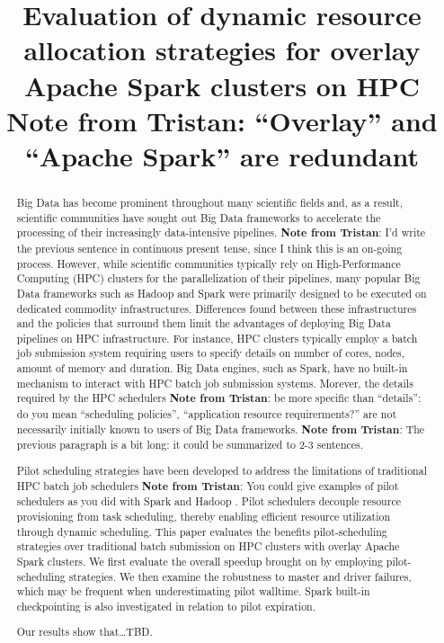 \documentclass{IEEEtran}
\newcommand{\tristan}[1]{\color{red}\textbf{Note from Tristan}:
      #1 \color{black}}
\newcommand{\TG}[1]{\tristan{#1}}
\begin{document}
\title{Evaluation of dynamic resource allocation strategies for overlay Apache
       Spark clusters on HPC \tristan{``Overlay'' and ``Apache Spark'' are redundant}}
\author{
    \IEEEauthorblockA{}
}
\maketitle

\begin{abstract}
    Big Data has become prominent throughout many scientific fields and, as a
    result, scientific communities have sought out Big Data frameworks to 
    accelerate the processing of their increasingly data-intensive pipelines.
    \TG{I'd write the previous sentence in continuous present tense, since I think
    this is an on-going process.}
    However, while scientific communities typically rely on High-Performance 
    Computing (HPC) clusters for the parallelization of their pipelines, many 
    popular Big Data frameworks such as Hadoop and Spark were primarily designed
    to be executed on dedicated commodity infrastructures. Differences found between
    these infrastructures and the policies that surround them limit the advantages
    of deploying Big Data pipelines on HPC infrastructure. For instance, HPC
    clusters typically employ a batch job submission system requiring users to
    specify details on number of cores, nodes, amount of memory and duration.
    Big Data engines, such as Spark, have no built-in mechanism to interact with
    HPC batch job submission systems. Morever, the details required by the HPC
    schedulers \TG{be more specific than ``details'': do you mean ``scheduling policies'',
    ``application resource requirerments?''
    } are not necessarily initially known to users of Big Data frameworks.
    \TG{The previous paragraph is a bit long: it could be summarized to 2-3
    sentences.}

    Pilot scheduling strategies have been developed to address the limitations 
    of traditional HPC batch job schedulers \TG{You could give examples of pilot schedulers as you did with Spark and Hadoop}.
    Pilot schedulers decouple resource
    provisioning from task scheduling, thereby enabling efficient resource
    utilization through dynamic scheduling. This paper evaluates the benefits 
    pilot-scheduling strategies over traditional batch submission
    on HPC clusters with overlay Apache Spark clusters. We first evaluate the
    overall speedup brought on by employing pilot-scheduling strategies. We then
    examine the robustness to master and driver failures, which may be frequent 
    when underestimating pilot walltime. Spark built-in checkpointing is also 
    investigated in relation to pilot expiration.

    Our results show that\ldots TBD.
\end{abstract}
\end{document}
